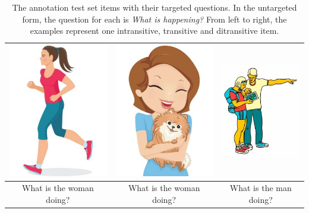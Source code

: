 \begin{table}[htb!]
\begin{center}
\begin{tabular}{|c|c|c|}
\hline
{\includegraphics[width=0.29\columnwidth]{figures/I30.jpg}} & {\includegraphics[width=0.3\columnwidth]{figures/I29.jpg}} & {\includegraphics[width=0.3\columnwidth]{figures/I28.jpg}} \\
\hline
What is the woman doing? & What is the woman doing? & What is the man doing? \\
\hline
\end{tabular}
\caption{\label{tab:test-sample-items} The annotation test set items with their targeted questions. In the untargeted form, the question for each is \textit{What is happening?} From left to right, the examples represent one intransitive, transitive and ditransitive item.}
\end{center}
\end{table}

